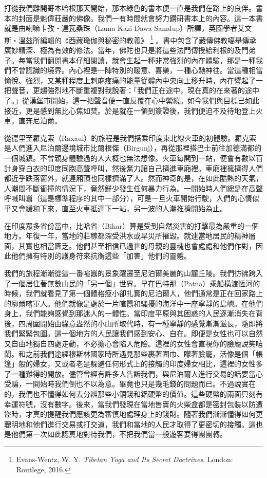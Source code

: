 打從我們離開哥本哈根那天開始，那本綠色的書本便一直是我們在路上的良伴。書本的封面是魁偉莊嚴的佛像。我們一有時間就會努力鑽研書本上的內容。這一本書就是由喇嘛卡孜‧達瓦桑珠（Lama
Kazi Dawa
Samdup）所譯，英國學者艾文斯‧溫玆所編輯的《西藏瑜伽與秘密的教義》%
\footnote{Evans-Wentz, W. Y. \textit{Tibetan Yoga and Its Secret Doctrines}. London: Routlege, 2016.}
。書中包含了藏傳佛教噶舉傳承廣妙精深、極為有效的修法。當年，佛陀也只是將這些法門傳授給利根的及門弟子。每當我們翻開書本仔細閱讀，就會生起一種非常強烈的內在體驗，那是一種我們不曾認識的境界。內心裡是一陣特別的暖意、喜樂，一種心馳神往。當這種相當愉悅、強烈，又某種程度上刺麻疼痛的能量從體內中央向上移升時，內在響起了一把聲音，更趨強烈地不斷重複對我說著：「我們正在途中，現在真的在來著的途中了。」從漢堡市開始，這一把聲音便一直反覆在心中縈繞。如今我們與目標已如此接近，更是感到無比心焦如焚。於是就在一領到簽證後，我們便迫不及待地登上火車，直奔尼泊爾。

從德里至羅克索（Raxaul）的旅程是我們搭乘印度東北線火車的初體驗。羅克索是人們進入尼泊爾邊境城市比爾根傑（Birgunj），再從那裡搭巴士前往加德滿都的一個城鎮。不曾親身體驗過的人大概也無法想像。火車每開到一站，便會有數以百計身穿白衣的印度同胞高聲呼叫，然後奮力讓自己擠進車廂裡。車廂裡擁擠得人們都近乎跌落窗外，就連厢頂也同樣擠滿了人。然而神奇的是，在如此酷熱的天氣，人潮間不斷衝撞的情況下，竟然鮮少發生任何暴力行為。一開始時人們總是在高聲呼喊叫囂（這是標準程序的其中一部分），可是一旦火車開始行駛，人們的心情似乎又會緩和下來，直至火車抵達下一站，另一波的人潮推擠開始為止。

在印度眾多省份當中，比哈省（Bihar）算是受到自然災害的打擊最為嚴重的一個地方。年復一年，當地的莊稼都深受洪水或旱災所摧毀。就連當地居民的精神層面，其實也相當匱乏。他們甚至相信已過世的母親的靈魂也會處處和他們作對，因此他們擁有特別的護身符來抗衡這些「加害」他們的靈體。

我們的旅程漸漸從這一番喧囂的景象躍遷至尼泊爾美麗的山麓丘陵。我們彷彿跨入了一個居住著無數山民的「另一個」世界。早在巴特那（Patna）乘船橫渡恆河的時候，我們就看見了第一個體格瘦小卻扎實的尼泊爾人，他們通常是正在回家路上的廓爾喀軍人。他們就像是處於一片喧囂和騷擾的海洋中一座寧靜的島嶼。在他們身上，我們能夠感覺到那迷人的一體性。當印度平原與其困惑的人民逐漸消失在背後，四周圍開始由綠意盎然的小山所取代時，有一種寧靜的感覺漸漸滋長，隨即將我們緊緊包圍。這一個地方的人民讓我們感到安心、自在。即便是女性也可以自然又自由地獨自四處走動，不必擔心會陷入危險。這裡的女性會直視你的臉龐說笑嘻鬧。和之前我們途經穆斯林國家時所遇見那些裹著圍巾、矇著臉龐，活像是個「帳篷」般的婦女，又或者老是躲避任何形式上的接觸的印度婦女相比，這裡的女性多了一種難得的開放。儘管曾經有許多人告訴我們，與尼泊爾人進行交易的話要當心受騙，一開始時我們倒也不以為意。畢竟也只是幾毛錢的問題而已。不過說實在的，我們也不懂得如何去分辨那些小銅錢和鋁硬幣的價值。這些硬幣的兩面只刻有幸運符號，沒有數字。後來，當我們發現在當地售賣的火柴盒都是密封包裝以防遭盜時，才真的提醒我們應該更為審慎地處理身上的錢財。隨著我們漸漸懂得如何更聰明地和他們進行交易或打交道，我們和當地的人民才取得了更密切的接觸。這也是他們第一次如此認真地對待我們，不把我們當一般遊客耍得團團轉。


